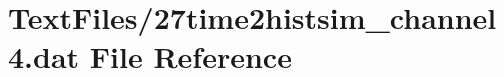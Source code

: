 \hypertarget{27time2histsim__channel4_8dat}{}\section{Text\+Files/27time2histsim\+\_\+channel4.dat File Reference}
\label{27time2histsim__channel4_8dat}
